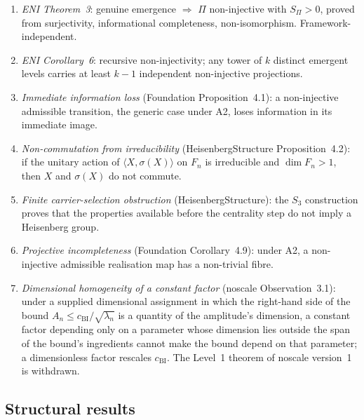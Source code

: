 \documentclass[11pt,a4paper]{article}
\theoremstyle{definition}
\newcommand{\SPI}{S_\Pi}
\newcommand{\cchi}{c_{\mathrm{BI}}}
\begin{document}
      \begin{enumerate}
        \item \textit{ENI Theorem~3}: genuine emergence $\Rightarrow$ $\Pi$ non-injective with
        $\SPI > 0$, proved from surjectivity, informational completeness, non-isomorphism.
        Framework-independent.

        \item \textit{ENI Corollary~6}: recursive non-injectivity; any tower of $k$ distinct
        emergent levels carries at least $k-1$ independent non-injective projections.

        \item \textit{Immediate information loss} (Foundation Proposition~4.1): a non-injective
        admissible transition, the generic case under A2, loses information in its immediate image.

        \item \textit{Non-commutation from irreducibility} (HeisenbergStructure Proposition~4.2):
        if the unitary action of $\langle X, \sigma(X)\rangle$ on $F_n$ is irreducible and
        $\dim F_n > 1$, then $X$ and $\sigma(X)$ do not commute.

        \item \textit{Finite carrier-selection obstruction}
        (HeisenbergStructure): the $S_3$ construction proves that the properties
        available before the centrality step do not imply a Heisenberg group.

        \item \textit{Projective incompleteness} (Foundation Corollary~4.9): under A2, a
        non-injective admissible realisation map has a non-trivial fibre.

        \item \textit{Dimensional homogeneity of a constant factor} (noscale Observation~3.1):
        under a supplied dimensional assignment in which the right-hand side of the bound
        $A_n \leq \cchi/\sqrt{\lambda_n}$ is a quantity of the amplitude's dimension, a constant factor
        depending only on a parameter whose dimension lies outside the span of the bound's ingredients
        cannot make the bound depend on that parameter; a dimensionless factor rescales $\cchi$.
        The Level~1 theorem of noscale version~1 is withdrawn.
      \end{enumerate}

    \subsection{Structural results}
      \label{sec:structural}
\end{document}
